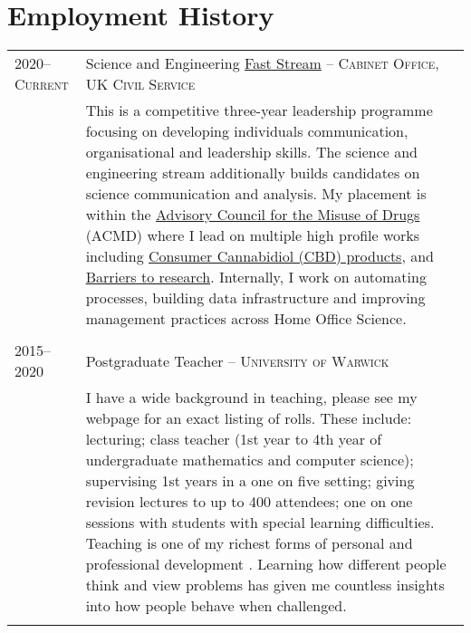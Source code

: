 \documentclass[a4paper,10pt]{article}
\begin{document}
\section{Employment History}
\begin{tabular}{p{2.25cm}|p{15cm}}
	\textsc{2020--Current} & Science and Engineering \href{https://www.faststream.gov.uk/}{Fast Stream} -- \textsc{Cabinet Office, UK Civil Service}\\&\footnotesize{This is a competitive three-year leadership programme focusing on developing individuals communication, organisational and leadership skills. The science and engineering stream additionally builds candidates on science communication and analysis. My placement is within the \href{https://www.gov.uk/government/organisations/advisory-council-on-the-misuse-of-drugs}{Advisory Council for the Misuse of Drugs} (ACMD) where I lead on multiple high profile works including \href{https://www.gov.uk/government/news/commercial-cannabidiol-cbd-products-call-for-evidence}{Consumer Cannabidiol (CBD) products}, and \href{https://www.gov.uk/government/publications/barriers-to-research-beyond-cannabinoids-call-for-evidence}{Barriers to research}. Internally, I work on automating processes, building data infrastructure and improving management practices across Home Office Science.}\\\multicolumn{2}{c}{} \\
	\textsc{2015--2020} & Postgraduate Teacher -- \textsc{University of Warwick}\\&\footnotesize{I have a wide background in teaching, please see my webpage for an exact listing of rolls. These include: lecturing; class teacher (1st year to 4th year of undergraduate mathematics and computer science); supervising 1st years in a one on five setting; giving revision lectures to up to 400 attendees; one on one sessions with students with special learning difficulties. Teaching is one of my richest forms of personal and professional development	. Learning how different people think and view problems has given me countless insights into how people behave when challenged.}\\\multicolumn{2}{c}{} \\
\end{tabular}
\end{document}

